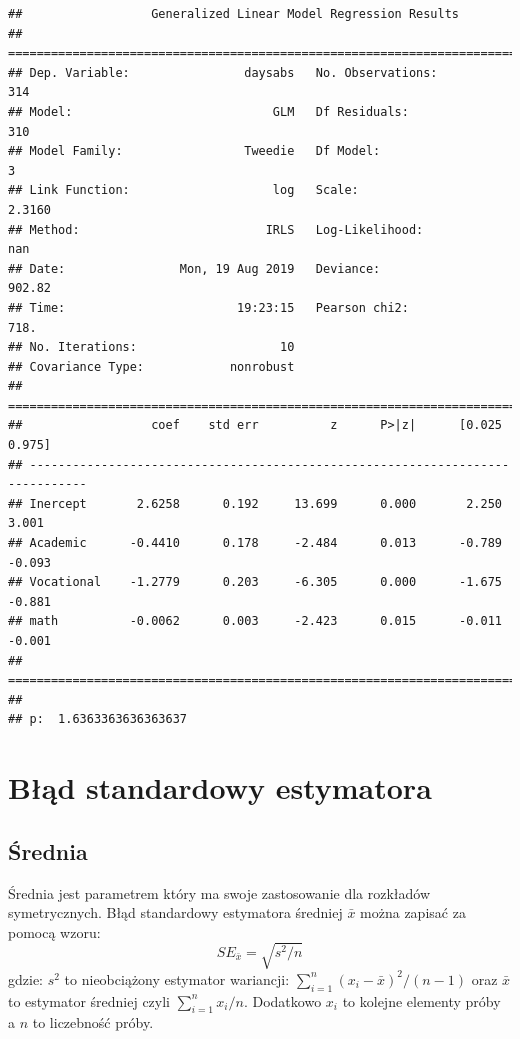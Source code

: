 \documentclass[polish,]{book}
\begin{document}
\begin{verbatim}
##                  Generalized Linear Model Regression Results                  
## ==============================================================================
## Dep. Variable:                daysabs   No. Observations:                  314
## Model:                            GLM   Df Residuals:                      310
## Model Family:                 Tweedie   Df Model:                            3
## Link Function:                    log   Scale:                          2.3160
## Method:                          IRLS   Log-Likelihood:                    nan
## Date:                Mon, 19 Aug 2019   Deviance:                       902.82
## Time:                        19:23:15   Pearson chi2:                     718.
## No. Iterations:                    10                                         
## Covariance Type:            nonrobust                                         
## ==============================================================================
##                  coef    std err          z      P>|z|      [0.025      0.975]
## ------------------------------------------------------------------------------
## Inercept       2.6258      0.192     13.699      0.000       2.250       3.001
## Academic      -0.4410      0.178     -2.484      0.013      -0.789      -0.093
## Vocational    -1.2779      0.203     -6.305      0.000      -1.675      -0.881
## math          -0.0062      0.003     -2.423      0.015      -0.011      -0.001
## ==============================================================================
## 
## p:  1.6363363636363637
\end{verbatim}

\hypertarget{R7}{%
\chapter{Błąd standardowy estymatora}\label{R7}}

\hypertarget{R71}{%
\section{Średnia}\label{R71}}

Średnia jest parametrem który ma swoje zastosowanie dla rozkładów symetrycznych.
Błąd standardowy estymatora średniej \(\bar{x}\) można zapisać za pomocą wzoru:
\begin{equation}
SE_{\bar{x}}=\sqrt{s^2/n}
\label{eq:se01}
\end{equation}
gdzie: \(s^2\) to nieobciążony estymator wariancji: \(\sum_{i=1}^{n}(x_i-\bar{x})^2/(n-1)\) oraz \(\bar{x}\) to estymator średniej czyli \(\sum_{i=1}^{n}x_i/n\). Dodatkowo \(x_i\) to kolejne elementy próby a \(n\) to liczebność próby.
\end{document}
